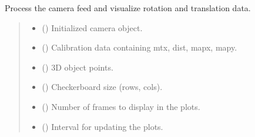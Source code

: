 \documentclass[letterpaper,10pt,english]{sphinxmanual}
\begin{document}

\begin{fulllineitems}
\label{\detokenize{PoseEstimator:PoseEstimator.pose_estimator.process_camera_feed}}
\pysigstartsignatures
{}
\pysigstopsignatures
\sphinxAtStartPar
Process the camera feed and visualize rotation and translation data.
\begin{quote}\begin{description}
\begin{itemize}
\item {} 
\sphinxAtStartPar
{} () \textendash{} Initialized camera object.

\item {} 
\sphinxAtStartPar
{} () \textendash{} Calibration data containing mtx, dist, mapx, mapy.

\item {} 
\sphinxAtStartPar
{} () \textendash{} 3D object points.

\item {} 
\sphinxAtStartPar
{} () \textendash{} Checkerboard size (rows, cols).

\item {} 
\sphinxAtStartPar
{} () \textendash{} Number of frames to display in the plots.

\item {} 
\sphinxAtStartPar
{} () \textendash{} Interval for updating the plots.

\end{itemize}

\end{description}\end{quote}

\end{fulllineitems}
\end{document}
